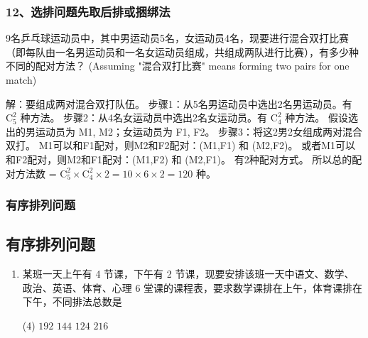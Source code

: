 \subsubsection{12、选排问题\*先取后排或捆绑法}
\begin{example}
    9名乒乓球运动员中，其中男运动员5名，女运动员4名，现要进行混合双打比赛（即每队由一名男运动员和一名女运动员组成，共组成两队进行比赛），有多少种不同的配对方法？ (Assuming "混合双打比赛" means forming two pairs for one match)
\end{example}
\begin{solution}
    解：要组成两对混合双打队伍。
    步骤1：从5名男运动员中选出2名男运动员。有 $\mathrm{C}_{5}^{2}$ 种方法。
    步骤2：从4名女运动员中选出2名女运动员。有 $\mathrm{C}_{4}^{2}$ 种方法。
    假设选出的男运动员为 M1, M2；女运动员为 F1, F2。
    步骤3：将这2男2女组成两对混合双打。
    M1可以和F1配对，则M2和F2配对：(M1,F1) 和 (M2,F2)。
    或者M1可以和F2配对，则M2和F1配对：(M1,F2) 和 (M2,F1)。
    有2种配对方式。
    所以总的配对方法数 = $\mathrm{C}_{5}^{2} \times \mathrm{C}_{4}^{2} \times 2 = 10 \times 6 \times 2 = 120$ 种。
\end{solution}

\subsubsection{有序排列问题}


\subsection{有序排列问题}

\begin{enumerate}
    \item 某班一天上午有 4 节课，下午有 2 节课，现要安排该班一天中语文、数学、政治、英语、体育、心理 6 堂课的课程表，要求数学课排在上午，体育课排在下午，不同排法总数是
          \begin{tasks}(4)
              \task $192$
              \task $144$
              \task $124$
              \task $216$
          \end{tasks}
\end{enumerate}
